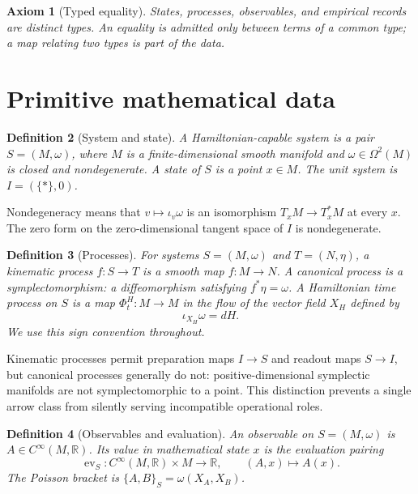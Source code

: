 \documentclass[11pt]{article}
\newtheorem{definition}{Definition}[section]
\newtheorem{axiom}[definition]{Axiom}
\newcommand{\R}{\mathbb R}
\begin{document}
\begin{axiom}[Typed equality]
States, processes, observables, and empirical records are distinct types.  An equality is admitted only between terms of a common type; a map relating two types is part of the data.
\end{axiom}

\section{Primitive mathematical data}

\begin{definition}[System and state]
A \emph{Hamiltonian-capable system} is a pair $S=(M,\omega)$, where $M$ is a finite-dimensional smooth manifold and $\omega\in\Omega^2(M)$ is closed and nondegenerate.  A \emph{state} of $S$ is a point $x\in M$.  The unit system is $I=(\{*\},0)$.
\end{definition}
Nondegeneracy means that $v\mapsto\iota_v\omega$ is an isomorphism $T_xM\to T_x^*M$ at every $x$.  The zero form on the zero-dimensional tangent space of $I$ is nondegenerate.

\begin{definition}[Processes]
For systems $S=(M,\omega)$ and $T=(N,\eta)$, a \emph{kinematic process} $f:S\to T$ is a smooth map $f:M\to N$.  A \emph{canonical process} is a symplectomorphism: a diffeomorphism satisfying $f^*\eta=\omega$.  A \emph{Hamiltonian time process} on $S$ is a map $\Phi^H_t:M\to M$ in the flow of the vector field $X_H$ defined by
\begin{equation}\label{eq:ham}
  \iota_{X_H}\omega=dH.
\end{equation}
We use this sign convention throughout.
\end{definition}

Kinematic processes permit preparation maps $I\to S$ and readout maps $S\to I$, but canonical processes generally do not: positive-dimensional symplectic manifolds are not symplectomorphic to a point.  This distinction prevents a single arrow class from silently serving incompatible operational roles.

\begin{definition}[Observables and evaluation]
An \emph{observable} on $S=(M,\omega)$ is $A\in C^\infty(M,\R)$.  Its value in mathematical state $x$ is the evaluation pairing
\[
  \operatorname{ev}_S:C^\infty(M,\R)\times M\to\R,
  \qquad (A,x)\mapsto A(x).
\]
The Poisson bracket is $\{A,B\}_S=\omega(X_A,X_B)$.
\end{definition}
\end{document}
